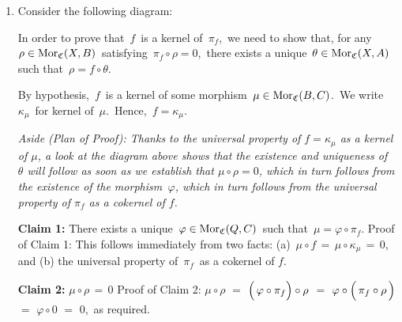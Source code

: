 \begin{enumerate}
\item
	Consider the following diagram:
	\begin{center}
	\end{center}
	In order to prove that \,$f$\, is a kernel of \,$\pi_{f}$,\,
	we need to show that, for any \,$\rho \in \textnormal{Mor}_{\mathfrak{C}}(X,B)$\,
	satisfying \,$\pi_{f} \circ \rho = 0$,\,
	there exists a unique \,$\theta \in \textnormal{Mor}_{\mathfrak{C}}(X,A)$\,
	such that \,$\rho = f \circ \theta$.\,

	\vskip 0.3cm
	\noindent
	By hypothesis, \,$f$\, is a kernel of some morphism \,$\mu \in \textnormal{Mor}_{\mathfrak{C}}(B,C)$.\,
	We write \,$\kappa_{\mu}$\, for kernel of \,$\mu$.\, Hence, \,$f = \kappa_{\mu}$.

	\vskip 0.3cm
	\noindent
	\textit{Aside (Plan of Proof):
	Thanks to the universal property of $f = \kappa_{\mu}$ as a kernel of $\mu$,
	a look at the diagram above shows that
	the existence and uniqueness of \,$\theta$ will follow as soon as we establish
	that $\mu \circ \rho = 0$, which in turn follows from the existence of the morphism \,$\varphi$,
	which in turn follows from the universal property of $\pi_{f}$ as a cokernel of $f$.}

	\vskip 0.3cm
	\noindent
	\textbf{Claim 1:}\;\; There exists a unique \,$\varphi \in \textnormal{Mor}_{\mathfrak{C}}(Q,C)$\, such that \,$\mu = \varphi \circ \pi_{f}$.
	\vskip 0.1cm
	\noindent
	Proof of Claim 1:\;
	This follows immediately from two facts:
	(a)	\,$\mu \circ f \,=\, \mu \circ \kappa_{\mu} \,=\, 0$, and
	(b)	the universal property of \,$\pi_{f}$\, as a cokernel of $f$.

	\vskip 0.3cm
	\noindent
	\textbf{Claim 2:}\;\; $\mu \circ \rho \,=\, 0$
	\vskip 0.1cm
	\noindent
	Proof of Claim 2:\;
	$\mu \circ \rho$
	\;$=$\; $\left(\,\varphi \overset{{\color{white}1}}{\circ} \pi_{f}\right)\circ \rho$
	\;$=$\; $\varphi \circ \left(\, \pi_{f} \overset{{\color{white}1}}{\circ} \rho\, \right)$
	\;$=$\; $\varphi \circ 0$
	\;$=$\; $0$,\,
	as required.


\end{enumerate}
